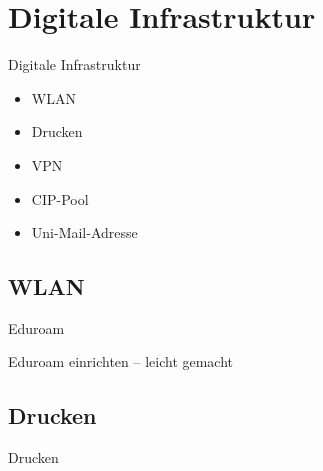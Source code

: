 
\section{Digitale Infrastruktur}
\begin{frame}{Digitale Infrastruktur}
    \large
    \begin{itemize}
        \item{WLAN}
        \item{Drucken}
        \item{VPN}
        \item{CIP-Pool}
        \item{Uni-Mail-Adresse}
    \end{itemize}
\end{frame}


\subsection{WLAN}
\begin{frame}{Eduroam}
\end{frame}

\begin{frame}{Eduroam einrichten -- leicht gemacht}
\end{frame}


\subsection{Drucken}
\begin{frame}{Drucken}
\end{frame}


